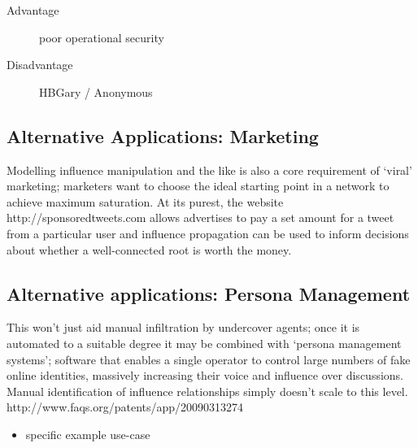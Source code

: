 \begin{description}
\item[Advantage] poor operational security
\item[Disadvantage] HBGary / Anonymous
\end{description}

\subsection{Alternative Applications: Marketing}
Modelling influence manipulation and the like is also a core requirement of
`viral' marketing; marketers want to choose the ideal starting point in a
network to achieve maximum saturation. At its purest, the website
http://sponsoredtweets.com allows advertises to pay a set amount for a tweet
from a particular user and influence propagation can be used to inform decisions
about whether a well-connected root is worth the money. 

\subsection{Alternative applications: Persona Management}
This won't just aid manual infiltration by undercover agents; once it is
automated to a suitable degree it may be combined with `persona management
systems'; software that enables a single operator to control large numbers of
fake online identities, massively increasing their voice and influence over
discussions. Manual identification of influence relationships simply doesn't
scale to this level.
http://www.faqs.org/patents/app/20090313274

\begin{itemize}
\item specific example use-case
\end{itemize}
% 


